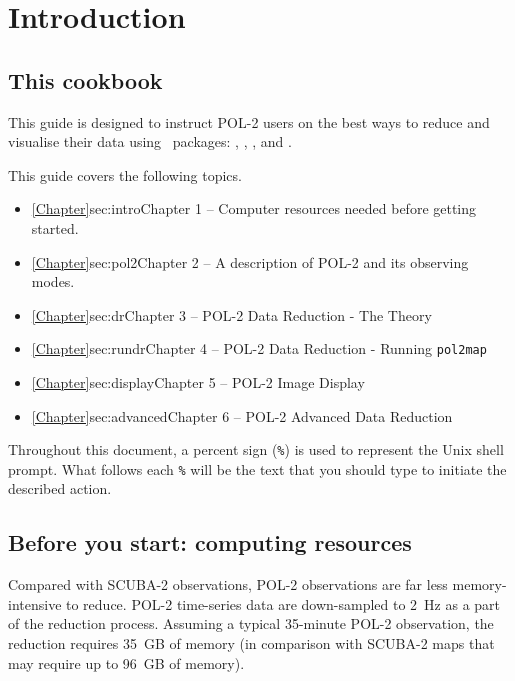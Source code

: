 \chapter{Introduction}
\label{sec:intro}

\renewcommand{\thepage}{\arabic{page}}
\setcounter{page}{1}

\section{This cookbook}

This guide is designed to instruct POL-2 users on the best ways to
reduce and visualise their data using \starlink\ packages: \smurf
\cite{smurf}, \Kappa \cite{kappa}, \polpack \cite{polpack}, and \gaia \cite{gaia}.

This guide covers the following topics.
\begin{itemize}
\itemsep0em
\item \cref{Chapter}{sec:intro}{Chapter 1} -- Computer resources needed before getting started.
\item \cref{Chapter}{sec:pol2}{Chapter 2} -- A description of POL-2 and its observing modes.
\item \cref{Chapter}{sec:dr}{Chapter 3} -- POL-2 Data Reduction - The Theory
\item \cref{Chapter}{sec:rundr}{Chapter 4} -- POL-2 Data Reduction - Running \texttt{pol2map}
\item \cref{Chapter}{sec:display}{Chapter 5} -- POL-2 Image Display
\item \cref{Chapter}{sec:advanced}{Chapter 6} -- POL-2 Advanced Data Reduction

\end{itemize}

Throughout this document, a percent sign (\texttt{\%}) is used to
represent the Unix shell prompt. What follows each \texttt{\%} will be
the text that you should type to initiate the described action.

\section{ Before you start: computing resources}
\label{sec:computing}

Compared with SCUBA-2 observations, POL-2 observations are far less
memory-intensive to reduce. POL-2 time-series data are down-sampled to
2~Hz as a part of the reduction process. Assuming a typical 35-minute
POL-2 observation, the reduction requires 35~GB of memory (in
comparison with SCUBA-2 maps that may require up to 96~GB of memory).

